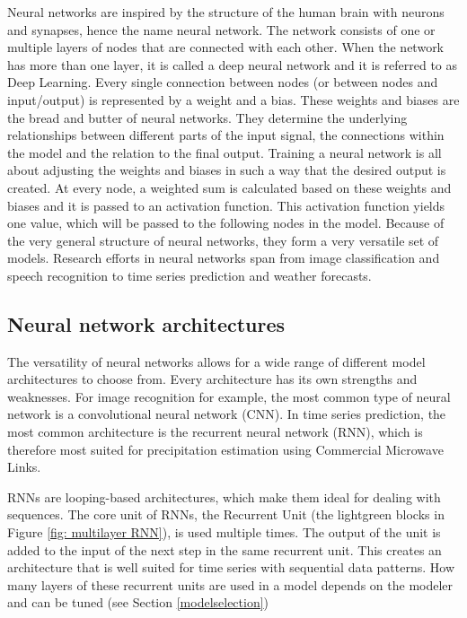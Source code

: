 \documentclass[twocolumn, 10pt, a4paper]{memoir}
\begin{document}
	Neural networks are inspired by the structure of the human brain with neurons and synapses, hence the name neural network. The network consists of one or multiple layers of nodes that are connected with each other. When the network has more than one layer, it is called a deep neural network and it is referred to as Deep Learning. Every single connection between nodes (or between nodes and input/output) is represented by a weight and a bias. These weights and biases are the bread and butter of neural networks. They determine the underlying relationships between different parts of the input signal, the connections within the model and the relation to the final output. Training a neural network is all about adjusting the weights and biases in such a way that the desired output is created. At every node, a weighted sum is calculated based on these weights and biases and it is passed to an activation function. This activation function yields one value, which will be passed to the following nodes in the model.
	Because of the very general structure of neural networks, they form a very versatile set of models. Research efforts in neural networks span from image classification and speech recognition to time series prediction and weather forecasts.
	
	\subsection{Neural network architectures} \label{NN architecture}
	The versatility of neural networks allows for a wide range of different model architectures to choose from. Every architecture has its own strengths and weaknesses. For image recognition for example, the most common type of neural network is a convolutional neural network (CNN). In time series prediction, the most common architecture is the recurrent neural network (RNN), which is therefore most suited for precipitation estimation using Commercial Microwave Links.
	
	RNNs are looping-based architectures, which make them ideal for dealing with sequences. The core unit of RNNs, the Recurrent Unit (the lightgreen blocks in Figure \ref{fig: multilayer RNN}), is used multiple times. The output of the unit is added to the input of the next step in the same recurrent unit. This creates an architecture that is well suited for time series with sequential data patterns. How many layers of these recurrent units are used in a model depends on the modeler and can be tuned (see Section \ref{modelselection})
	
\end{document}
